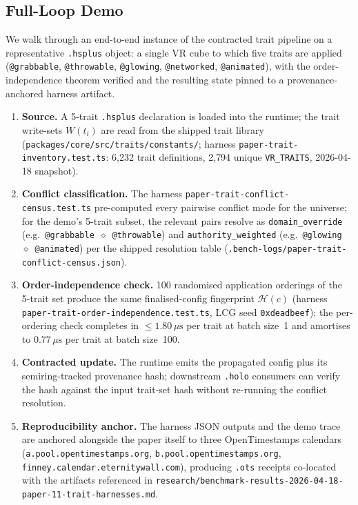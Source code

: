 \documentclass[sigconf,nonacm]{acmart}
\makeatletter
\newcommand{\hsplus}{\texttt{.hsplus}}
\newcommand{\traitop}[1]{\texttt{@#1}}
\newcommand{\hashfn}{\mathcal{H}}
\newcommand{\conflictop}{\diamond}
\makeatother
\begin{document}
\subsection{Full-Loop Demo}
\label{sec:demo}

We walk through an end-to-end instance of the contracted trait pipeline
on a representative \hsplus{} object: a single VR cube to which five
traits are applied (\traitop{grabbable}, \traitop{throwable},
\traitop{glowing}, \traitop{networked}, \traitop{animated}), with the
order-independence theorem verified and the resulting state pinned to a
provenance-anchored harness artifact.

\begin{enumerate}
  \item \textbf{Source.} A 5-trait \hsplus{} declaration is loaded into
    the runtime; the trait write-sets $W(t_i)$ are read from the shipped
    trait library
    (\texttt{packages/core/src/traits/constants/}; harness
    \texttt{paper-trait-inventory.test.ts}: 6{,}232 trait definitions,
    2{,}794 unique \texttt{VR\_TRAITS}, 2026-04-18 snapshot).
  \item \textbf{Conflict classification.} The harness
    \texttt{paper-trait-conflict-census.test.ts} pre-computed every
    pairwise conflict mode for the universe; for the demo's 5-trait
    subset, the relevant pairs resolve as \texttt{domain\_override}
    (e.g.\ \traitop{grabbable}~$\conflictop$~\traitop{throwable}) and
    \texttt{authority\_weighted} (e.g.\ \traitop{glowing}~$\conflictop$~\traitop{animated})
    per the shipped resolution table
    (\texttt{.bench-logs/paper-trait-conflict-census.json}).
  \item \textbf{Order-independence check.} 100 randomised application
    orderings of the 5-trait set produce the same finalised-config
    fingerprint $\hashfn(c)$ (harness
    \texttt{paper-trait-order-independence.test.ts}, LCG seed
    \texttt{0xdeadbeef}); the per-ordering check completes in
    $\leq\!1.80\,\mu\text{s}$ per trait at batch size~1 and amortises to
    $0.77\,\mu\text{s}$ per trait at batch size~100.
  \item \textbf{Contracted update.} The runtime emits the propagated
    config plus its semiring-tracked provenance hash; downstream
    \texttt{.holo} consumers can verify the hash against the input
    trait-set hash without re-running the conflict resolution.
  \item \textbf{Reproducibility anchor.} The harness JSON outputs and
    the demo trace are anchored alongside the paper itself to three
    OpenTimestamps calendars (\texttt{a.pool.opentimestamps.org},
    \texttt{b.pool.opentimestamps.org},
    \texttt{finney.calendar.eternitywall.com}), producing \texttt{.ots}
    receipts co-located with the artifacts referenced in
    \texttt{research/benchmark-results-2026-04-18-paper-11-trait-harnesses.md}.
\end{enumerate}
\end{document}
